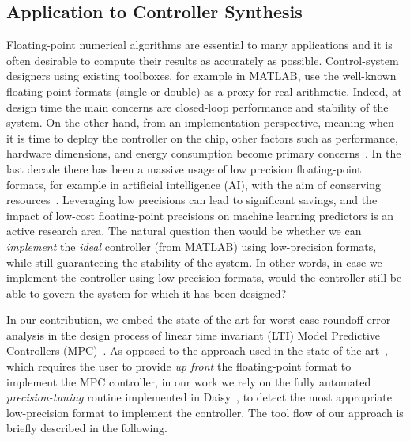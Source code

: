 \subsection{Application to Controller Synthesis}
\label{controllers}
%
Floating-point numerical algorithms are essential to many applications and it is often desirable to compute their results as accurately as possible.
%
Control-system designers using existing toolboxes, for example in MATLAB, use the well-known floating-point formats (single or double) as a proxy for real arithmetic. 
%
Indeed, at design time the main concerns are closed-loop performance and stability of the system.
%
%
%
On the other hand, from an implementation perspective, meaning when it is time to deploy the controller on the chip, other factors such as performance, hardware dimensions, and energy consumption become primary concerns~\cite{suardi}.
%
In the last decade there has been a massive usage of low precision floating-point formats, for example in artificial intelligence (AI), with the aim of conserving resources~\cite{fppower}.
%
Leveraging low precisions can lead to significant savings, and the impact of low-cost floating-point precisions on machine learning predictors is an active research area.
%
The natural question then would be whether we can \emph{implement} the \emph{ideal} controller (from MATLAB) using low-precision formats, while still guaranteeing the stability of the system.
%
In other words, in case we implement the controller using low-precision formats, would the controller still be able to govern the system for which it has been designed?
%
%

In our contribution, we embed the state-of-the-art for worst-case roundoff error analysis in the design process of linear time invariant (LTI) Model Predictive Controllers (MPC)~\cite{mpc}.
%
As opposed to the approach used in the state-of-the-art~\cite{suardi}, which requires the user to provide \emph{up front} the floating-point format to implement the MPC controller, in our work we rely on the fully automated \emph{precision-tuning} routine implemented in Daisy~\cite{darulova2018daisy}, to detect the most appropriate low-precision format to implement the controller.
%
The tool flow of our approach is briefly described in the following.

